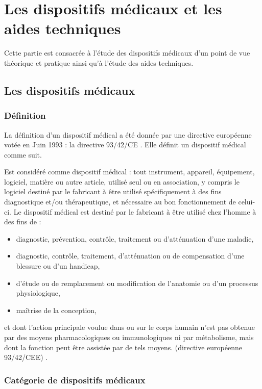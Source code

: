 \chapter{Les dispositifs médicaux et les aides techniques}

Cette partie est consacrée à l'étude des dispositifs médicaux d'un point de vue théorique et pratique ainsi qu'à l'étude des aides techniques.

\section{Les dispositifs médicaux}

\subsection{Définition}

La définition d'un dispositif médical a été donnée par une directive européenne votée en Juin 1993 : la directive 93/42/CE \cite{Directive93/42/CEE}. Elle définit un dispositif médical comme suit.

Est considéré comme dispositif médical : tout instrument, appareil, équipement, logiciel, matière ou autre article, utilisé seul ou en association, y compris le logiciel destiné par le fabricant à être utilisé spécifiquement à des fins diagnostique et/ou thérapeutique, et nécessaire au bon fonctionnement de celui-ci. Le dispositif médical est destiné par le fabricant à être utilisé chez l'homme à des fins de :
\begin{itemize}
\item diagnostic, prévention, contrôle, traitement ou d'atténuation d'une maladie,
\item diagnostic, contrôle, traitement, d'atténuation ou de compensation d'une blessure ou d'un handicap,
\item d'étude ou de remplacement ou modification de l'anatomie ou d'un processus physiologique,
\item maîtrise de la conception,
\end{itemize}
et dont l'action principale voulue dans ou sur le corps humain n'est pas obtenue par des moyens pharmacologiques ou immunologiques ni par métabolisme, mais dont la fonction peut être assistée par de tels moyens. (directive européenne 93/42/CEE) \cite{Directive93/42/CEE}.

\subsection{Catégorie de dispositifs médicaux}

